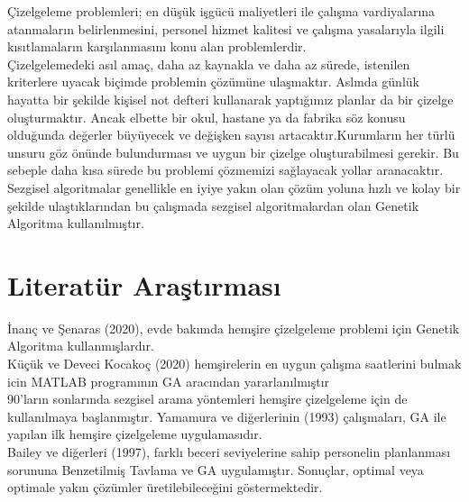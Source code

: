 \documentclass[12pt, a4paper]{article}
\begin{document}
\begin{flushleft}
	Çizelgeleme problemleri; en düşük işgücü maliyetleri ile çalışma vardiyalarına 
	atanmaların belirlenmesini, personel hizmet kalitesi ve çalışma yasalarıyla ilgili 
	kısıtlamaların karşılanmasını konu alan problemlerdir.\cite{kuccuk2021hemcsire}\\[15pt]
	
	Çizelgelemedeki asıl amaç, daha az kaynakla ve daha az sürede, 
	istenilen kriterlere uyacak biçimde problemin çözümüne ulaşmaktır.
	Aslında günlük hayatta bir şekilde kişisel not defteri kullanarak yaptığımız planlar da bir çizelge oluşturmaktır. Ancak elbette bir okul, hastane ya da fabrika söz konusu olduğunda değerler 
	büyüyecek ve değişken sayısı artacaktır.Kurumların her türlü unsuru göz önünde bulundurması ve uygun bir çizelge oluşturabilmesi gerekir. Bu sebeple daha kısa sürede bu problemi 
	çözmemizi sağlayacak yollar aranacaktır.\\[15pt]
	
	Sezgisel algoritmalar genellikle en iyiye yakın olan çözüm yoluna hızlı ve kolay bir şekilde ulaştıklarından bu çalışmada sezgisel algoritmalardan olan Genetik Algoritma kullanılmıştır.
	
	
	
	\section{Literatür Araştırması}
	
		\cite{inancc2020solving} 
	İnanç ve Şenaras (2020), evde bakımda hemşire çizelgeleme problemi için 
	Genetik Algoritma kullanmışlardır.\\[10pt]
	
	\cite{kuccuk2021hemcsire} 
	Küçük ve Deveci Kocakoç (2020) hemşirelerin en uygun çalışma saatlerini bulmak icin  MATLAB programının GA aracından yararlanılmıştır\\[10pt]
	
	
	
	
	\cite{yamamura1993nurse}
	90'ların sonlarında sezgisel arama yöntemleri hemşire çizelgeleme için de kullanılmaya 
	başlanmıştır. Yamamura ve diğerlerinin (1993) çalışmaları, GA ile yapılan ilk hemşire 
	çizelgeleme uygulamasıdır.\\[10pt]
	
	\cite{bailey1997using} 
	Bailey ve diğerleri (1997), farklı beceri seviyelerine sahip 
	personelin planlanması sorununa Benzetilmiş Tavlama ve GA uygulamıştır. Sonuçlar, 
	optimal veya optimale yakın çözümler üretilebileceğini göstermektedir.\\[10pt]
	

\end{flushleft}
\end{document}
